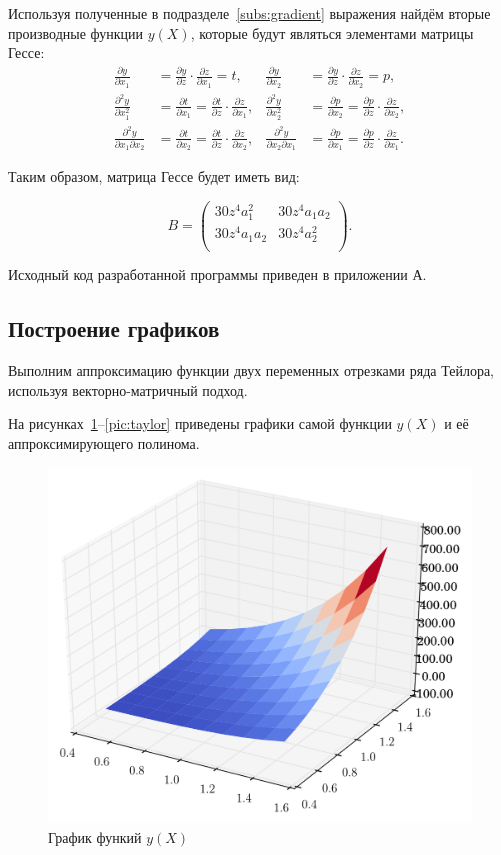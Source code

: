 Используя полученные в подразделе~\ref{subs:gradient} выражения найдём вторые производные
функции $y(X)$, которые будут являться элементами матрицы Гессе:
\begin{align*}
  \frac{\partial y}{\partial x_1} &= \frac{\partial y}{\partial z} \cdot \frac{\partial z}{\partial x_1} = t,
  &\frac{\partial y}{\partial x_2}& = \frac{\partial y}{\partial z} \cdot \frac{\partial z}{\partial x_2} = p, \\
  \frac{\partial^2 y}{\partial x_1^2} &= \frac{\partial t}{\partial x_1} = \frac{\partial t}{\partial z} \cdot \frac{\partial z}{\partial x_1},
  &\frac{\partial^2 y} {\partial x_2^2}& = \frac{\partial p}{\partial x_2} =  \frac{\partial p}{\partial z} \cdot \frac{\partial z}{\partial x_2}, \\ 
  \frac{\partial^2 y}{\partial x_1 \partial x_2} &= \frac{\partial t}{\partial x_2} = \frac{\partial t}{\partial z} \cdot \frac{\partial z}{\partial x_2},
  &\frac{\partial^2 y}{\partial x_2 \partial x_1} &= \frac{\partial p}{\partial x_1} = \frac{\partial p}{\partial z} \cdot \frac{\partial z}{\partial x_1}.
\end{align*}

Таким образом, матрица Гессе будет иметь вид:

\[
  B =
    \left(
      \begin{array}{cc}
        30 z^4 a_1^2 & 30 z^4 a_1 a_2 \\
        30 z^4 a_1 a_2 & 30 z^4 a_2^2 \\
      \end{array}
    \right)
  .
\]

Исходный код разработанной программы приведен в приложении А.


\subsection{Построение графиков}
Выполним аппроксимацию функции двух переменных отрезками ряда Тейлора, используя
векторно-матричный подход.

\newpage

На рисунках~\ref{pic:real}--\ref{pic:taylor} приведены
графики самой функции $y(X)$ и её аппроксимирующего полинома.
\begin{figure}[h!]
  \centering
  \includegraphics[width=0.65\linewidth]{pic/real_2}
  \caption{График функий $y(X)$}
  \label{pic:real}
\end{figure}

